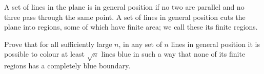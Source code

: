 A set of lines in the plane is in general position
 if no two are parallel and no three pass through the same point. A set 
of lines in general position cuts the plane into regions, some of which 
have finite area; we call these its finite regions.

Prove that for all sufficiently large $n$,  in any set of $n$ lines in general position it is possible to colour at least $\sqrt{n}$ lines blue in such a way that none of its finite regions has a completely blue boundary.

